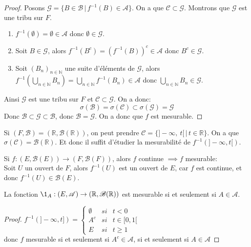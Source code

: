 \begin{proof}
	Posons $\mathscr{G} = \{ B \in \mathscr{B} \, | \, f^{-1}(B) \in \mathscr{A} \}$. On a que $\mathscr{C} \subset \mathscr{G}$.
	Montrons que $\mathscr{G}$ est une tribu sur $F$.
	\begin{enumerate}
		\item $f^{-1}(\emptyset) = \emptyset \in \mathscr{A}$ donc $\emptyset \in \mathscr{G}$.
		\item Soit $B \in \mathscr{G}$, alors $f^{-1}(B^c) = (f^{-1}(B))^c \in \mathscr{A}$ donc $B^c \in \mathscr{G}$.
		\item Soit $(B_n)_{n \in \mathbb{N}}$ une suite d'éléments de $\mathscr{G}$, alors
		      $f^{-1}(\bigcup\limits_{n \in \mathbb{N}} B_n) = \bigcup\limits_{n \in \mathbb{N}} f^{-1}(B_n) \in \mathscr{A}$ donc
		      $\bigcup\limits_{n \in \mathbb{N}} B_n \in \mathscr{G}$.
	\end{enumerate}
	Ainsi $\mathscr{G}$ est une tribu sur $F$ et $\mathscr{C} \subset \mathscr{G}$.
	On a donc:
	\[ \sigma(\mathscr{B}) = \sigma(\mathscr{C}) \subset \sigma(\mathscr{G}) = \mathscr{G} \]
	Donc $\mathscr{B} \subset \mathscr{G} \subset \mathscr{B}$, donc $\mathscr{B} = \mathscr{G}$.
	On a donc que $f$ est mesurable.
\end{proof}


\begin{example}[Application]
	Si $(F, \mathscr{B}) = (\mathbb{R}, \mathscr{B}(\mathbb{R}))$, on peut prendre $\mathscr{C} = \{ ]-\infty,\   t[ \, | \, t \in \mathbb{R} \}$. On a que
				$\sigma(\mathscr{C}) = \mathscr{B}(\mathbb{R})$. Et donc il suffit d'étudier la mesurabilité de $f^{-1}(]-\infty, t[)$.
\end{example}


\begin{remarque}
	Si $f : (E,\mathscr{B}(E)) \rightarrow (F,\mathscr{B}(F))$, alors $f$ continue $\implies f$ mesurable:\\
	Soit $U$ un ouvert de $F$, alors $f^{-1}(U)$ est un ouvert de $E$, car $f$ est continue, et donc $f^{-1}(U) \in \mathscr{B}(E)$.
\end{remarque}


\begin{prop}
	La fonction $\1_A : (E,\mathscr{A}) \rightarrow (\mathbb{R},\mathscr{B}(\mathbb{R}))$ est mesurable si et seulement si $A \in \mathscr{A}$.
\end{prop}

\begin{proof}
	$f^{-1}(]-\infty, t]) = \left\{ \begin{array}{crl}
			\emptyset & si & t < 0       \\
			A^c       & si & t \in [0,1[ \\
			E         & si & t \geq 1
		\end{array}
		\right.$\\
	donc $f$ mesurable si et seulement si $A^c\in \mathscr{A}$, si et seulement si $A\in \mathscr{A}$
\end{proof}

